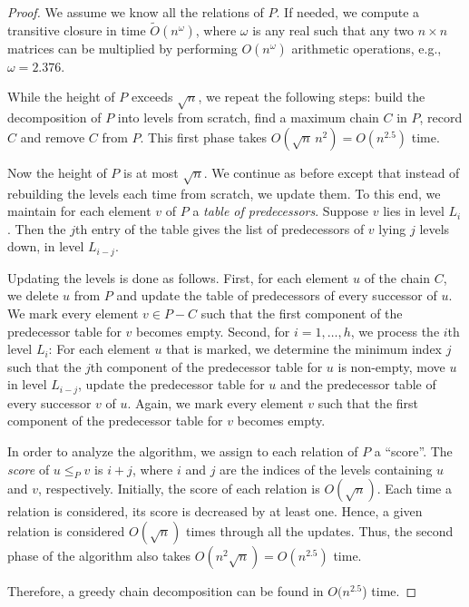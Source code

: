 \documentclass{article} \usepackage{fullpage}
\begin{document}
\begin{proof}
We assume we know all the relations of $P$. If needed, we compute a transitive closure in time $\widetilde{O}(n^\omega)$, where $\omega$ is any real such that any two $n \times n$ matrices can be multiplied by performing $O(n^\omega)$ arithmetic operations, e.g., $\omega =  2.376$.


While the height of $P$ exceeds $\sqrt{n}$, we repeat the following steps: build the decomposition of $P$ into levels from scratch, find a maximum chain $C$ in $P$, record $C$ and remove $C$ from $P$. This first phase takes $O(\sqrt{n}\,n^2) = O(n^{2.5})$ time.

Now the height of $P$ is at most $\sqrt{n}$. We continue as before except that instead of rebuilding the levels each time from scratch, we update them. To this end, we maintain for each element $v$ of $P$ a {\sl table of predecessors}. Suppose $v$ lies in level $L_i$. Then the $j$th entry of the table gives the list of predecessors of $v$ lying $j$ levels down, in level $L_{i-j}$.

Updating the levels is done as follows. First, for each element $u$ of the chain $C$, we delete $u$ from $P$ and update the table of predecessors of every successor of $u$. We mark every element $v \in P - C$ such that the first component of the predecessor table for $v$ becomes empty. Second, for $i = 1, \dots, h$, we process the $i$th level $L_i$: For each element $u$ that is marked, we determine the minimum index $j$ such that the $j$th component of the predecessor table for $u$ is non-empty, move $u$ in level $L_{i-j}$, update the predecessor table for $u$ and the predecessor table of every successor $v$ of $u$. Again, we mark every element $v$ such that the first component of the predecessor table for $v$ becomes empty.

In order to analyze the algorithm, we assign to each relation of $P$ a ``score''. The {\sl score\/} of $u \leqslant_P v$ is $i + j$, where $i$ and $j$ are the indices of the levels containing $u$ and $v$, respectively. Initially, the score of each relation is $O(\sqrt{n})$. Each time a relation is considered, its score is decreased by at least one. Hence, a given relation is considered $O(\sqrt{n})$ times through all the updates. Thus, the second phase of the algorithm also takes $O(n^2\sqrt{n}) = O(n^{2.5})$ time.

Therefore, a greedy chain decomposition can be found in $O(n^{2.5}$) time.
\end{proof}
\end{document}
